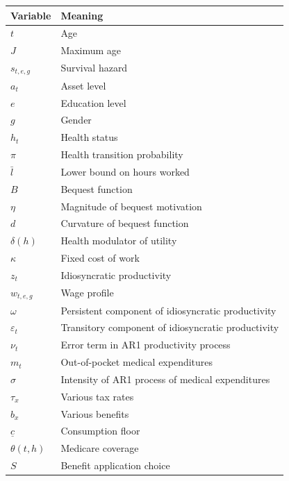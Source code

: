 \documentclass[
10pt, %
a4paper, %
oneside, %
headinclude,footinclude, %
BCOR5mm, %
]{scrartcl}
\begin{document}
\begin{center}
	\begin{tabular}{| l | l |}
	\hline
	Variable & Meaning \\
	\hline
	$t$ & Age \\
	$J$ & Maximum age \\
	$s_{t,e,g}$ & Survival hazard \\
	$a_{t}$ & Asset level \\
	$e$ & Education level \\
	$g$ & Gender \\
	$h_{t}$ & Health status \\
	$\pi$ & Health transition probability \\
	$\bar{l}$ & Lower bound on hours worked \\
	$B$ & Bequest function \\
	$\eta$ & Magnitude of bequest motivation \\
	$d$ & Curvature of bequest function \\
	$\delta(h)$ & Health modulator of utility \\
	$\kappa$ &  Fixed cost of work \\
	$z_{t}$ & Idiosyncratic productivity \\
	$w_{t,e,g}$ & Wage profile \\
	$\omega$ & Persistent component of idiosyncratic productivity \\
	$\varepsilon_t$ & Transitory component of idiosyncratic productivity \\
	$\nu_t$ & Error term in AR1 productivity process \\
	$m_t$ & Out-of-pocket medical expenditures \\
	$\sigma$ & Intensity of AR1 process of medical expenditures \\
	$\tau_x$ & Various tax rates \\
	$b_x$ & Various benefits \\
	$\underline{c}$ & Consumption floor \\
	$\theta(t,h)$ & Medicare coverage \\
	$S$ &  Benefit application choice \\
	\hline
	\end{tabular}
\end{center}




\renewcommand{\refname}{\spacedlowsmallcaps{References}} %




\end{document}
